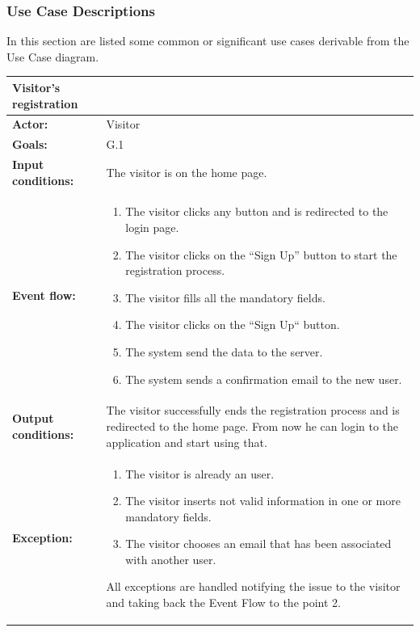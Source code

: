 \subsubsection{Use Case Descriptions}

In this section are listed some common or significant use cases derivable from
the Use Case diagram.

\begin{tabular} { p{5cm} p{8cm} } 
\textbf{Visitor's registration} & \\
\hline
\textbf{Actor:} & Visitor \\ 
\textbf{Goals:} & G.1 \\ 
\textbf{Input conditions:} & The visitor is on the home page. \\
\textbf{Event flow:} & \begin{enumerate}
						\item
						The visitor clicks any button and is redirected to the login page.
						\item
						The visitor clicks on the “Sign Up” button to start the registration process.
						\item
						The visitor fills all the mandatory fields.
						\item
						The visitor clicks on the “Sign Up“ button.
						\item
						The system send the data to the server.
						\item
						The system sends a confirmation email to the new user.
						\end{enumerate}\\ 
\textbf{Output conditions:} & The visitor successfully ends the registration process and is redirected to the home page. From now he can login to the application and start using that. \\ 
\textbf{Exception:} & \begin{enumerate}
						\item
						The visitor is already an user.
						\item
						The visitor inserts not valid information in one or more mandatory fields.
						\item
						The visitor chooses an email that has been associated with another user.
					\end{enumerate}
All exceptions are handled notifying the issue to the visitor and taking back the Event Flow to the point 2. \\
\hline
\end{tabular}


